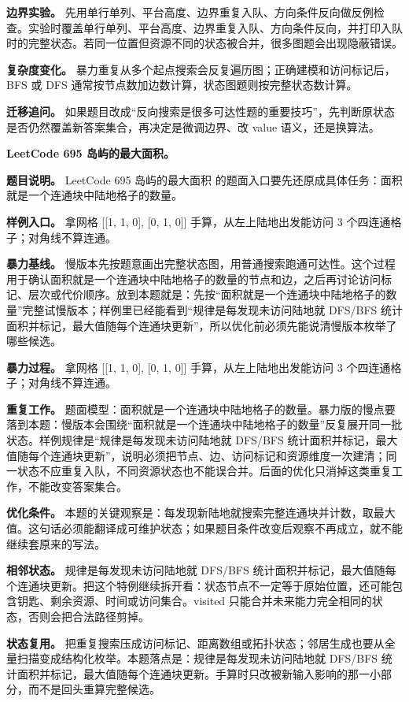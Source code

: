 \textbf{边界实验。} 先用单行单列、平台高度、边界重复入队、方向条件反向做反例检查。实验时覆盖单行单列、平台高度、边界重复入队、方向条件反向，并打印入队时的完整状态。若同一位置但资源不同的状态被合并，很多图题会出现隐蔽错误。

\textbf{复杂度变化。} 暴力重复从多个起点搜索会反复遍历图；正确建模和访问标记后，BFS 或 DFS 通常按节点数加边数计算，状态图题则按完整状态数计算。

\textbf{迁移追问。} 如果题目改成“反向搜索是很多可达性题的重要技巧”，先判断原状态是否仍然覆盖新答案集合，再决定是微调边界、改 value 语义，还是换算法。

\noindent\textbf{LeetCode 695 岛屿的最大面积。}

\textbf{题目说明。} LeetCode 695 岛屿的最大面积 的题面入口要先还原成具体任务：面积就是一个连通块中陆地格子的数量。

\textbf{样例入口。} 拿网格 [[1, 1, 0], [0, 1, 0]] 手算，从左上陆地出发能访问 3 个四连通格子；对角线不算连通。

\textbf{暴力基线。} 慢版本先按题意画出完整状态图，用普通搜索跑通可达性。这个过程用于确认面积就是一个连通块中陆地格子的数量的节点和边，之后再讨论访问标记、层次或代价顺序。放到本题就是：先按“面积就是一个连通块中陆地格子的数量”完整试慢版本；样例里已经能看到“规律是每发现未访问陆地就 DFS/BFS 统计面积并标记，最大值随每个连通块更新”，所以优化前必须先能说清慢版本枚举了哪些候选。

\textbf{暴力过程。} 拿网格 [[1, 1, 0], [0, 1, 0]] 手算，从左上陆地出发能访问 3 个四连通格子；对角线不算连通。

\textbf{重复工作。} 题面模型：面积就是一个连通块中陆地格子的数量。暴力版的慢点要落到本题：慢版本会围绕“面积就是一个连通块中陆地格子的数量”反复展开同一批状态。样例规律是“规律是每发现未访问陆地就 DFS/BFS 统计面积并标记，最大值随每个连通块更新”，说明必须把节点、边、访问标记和资源维度一次建清；同一状态不应重复入队，不同资源状态也不能误合并。后面的优化只消掉这类重复工作，不能改变答案集合。

\textbf{优化条件。} 本题的关键观察是：每发现新陆地就搜索完整连通块并计数，取最大值。这句话必须能翻译成可维护状态；如果题目条件改变后观察不再成立，就不能继续套原来的写法。

\textbf{相邻状态。} 规律是每发现未访问陆地就 DFS/BFS 统计面积并标记，最大值随每个连通块更新。把这个特例继续拆开看：状态节点不一定等于原始位置，还可能包含钥匙、剩余资源、时间或访问集合。visited 只能合并未来能力完全相同的状态，否则会把合法路径剪掉。

\textbf{状态复用。} 把重复搜索压成访问标记、距离数组或拓扑状态；邻居生成也要从全量扫描变成结构化枚举。本题落点是：规律是每发现未访问陆地就 DFS/BFS 统计面积并标记，最大值随每个连通块更新。手算时只改被新输入影响的那一小部分，而不是回头重算完整候选。

